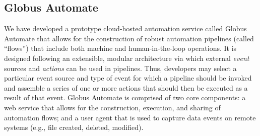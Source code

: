 \documentclass{aip-cp}
\begin{document}



\subsection{Globus Automate}

We have developed a prototype cloud-hosted automation service called Globus Automate
that allows for the construction of robust automation pipelines (called ``flows'')
that include both machine and human-in-the-loop operations. 
It is designed following an extensible, modular architecture via which external
\emph{event} sources and \emph{actions} can be used in pipelines. 
Thus, developers may select a particular event source and type of event
for which a pipeline should be invoked and assemble a 
series of one or more actions that should then be executed as 
a result of that event.
Globus Automate is comprised of two core components: a web service
that allows for the construction, execution, and sharing of automation
flows; and a user agent that is used to capture data events on remote systems
(e.g., file created, deleted, modified). 
\end{document}
